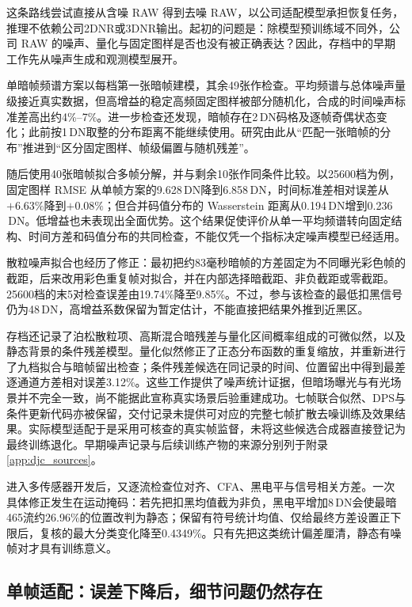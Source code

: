 \documentclass[11pt,a4paper,UTF8,fontset=fandol]{ctexart}
\newcommand{\dn}{\ensuremath{\,\mathrm{DN}}}
\begin{document}
这条路线尝试直接从含噪 RAW 得到去噪 RAW，以公司适配模型承担恢复任务，推理不依赖公司2DNR或3DNR输出。起初的问题是：除模型预训练域不同外，公司 RAW 的噪声、量化与固定图样是否也没有被正确表达？因此，存档中的早期工作先从噪声生成和观测模型展开。

单暗帧频谱方案以每档第一张暗帧建模，其余49张作检查。平均频谱与总体噪声量级接近真实数据，但高增益的稳定高频固定图样被部分随机化，合成的时间噪声标准差高出约4\%--7\%。进一步检查还发现，暗帧存在2\dn{}码格及逐帧奇偶状态变化；此前按1\dn{}取整的分布距离不能继续使用。研究由此从“匹配一张暗帧的分布”推进到“区分固定图样、帧级偏置与随机残差”。

随后使用40张暗帧拟合多帧分解，并与剩余10张作同条件比较。以25600档为例，固定图样 RMSE 从单帧方案的9.628\dn{}降到6.858\dn，时间标准差相对误差从$+6.63\%$降到$+0.08\%$；但合并码值分布的 Wasserstein 距离从0.194\dn{}增到0.236\dn。低增益也未表现出全面优势。这个结果促使评价从单一平均频谱转向固定结构、时间方差和码值分布的共同检查，不能仅凭一个指标决定噪声模型已经适用。

散粒噪声拟合也经历了修正：最初把约83毫秒暗帧的方差固定为不同曝光彩色帧的截距，后来改用彩色重复帧对拟合，并在内部选择暗截距、非负截距或零截距。25600档的末5对检查误差由19.74\%降至9.85\%。不过，参与该检查的最低扣黑信号仍为48\dn，高增益系数保留为暂定估计，不能直接把结果外推到近黑区。

存档还记录了泊松散粒项、高斯混合暗残差与量化区间概率组成的可微似然，以及静态背景的条件残差模型。量化似然修正了正态分布函数的重复缩放，并重新进行了九档拟合与暗帧留出检查；条件残差候选在同记录的时间、位置留出中得到最差逐通道方差相对误差3.12\%。这些工作提供了噪声统计证据，但暗场曝光与有光场景并不完全一致，尚不能据此宣称真实场景后验重建成功。七帧联合似然、DPS与条件更新代码亦被保留，交付记录未提供可对应的完整七帧扩散去噪训练及效果结果。实际模型适配于是采用可核查的真实帧监督，未将这些候选合成器直接登记为最终训练退化。早期噪声记录与后续训练产物的来源分别列于附录\ref{app:djc_sources}。

进入多传感器开发后，又逐流检查位对齐、CFA、黑电平与信号相关方差。一次具体修正发生在运动掩码：若先把扣黑均值截为非负，黑电平增加8\dn{}会使最暗465流约26.96\%的位置改判为静态；保留有符号统计均值、仅给最终方差设置正下限后，复核的最大分类变化降至0.4349\%。只有先把这类统计偏差厘清，静态有噪帧对才具有训练意义。

\subsection{单帧适配：误差下降后，细节问题仍然存在}
\end{document}
